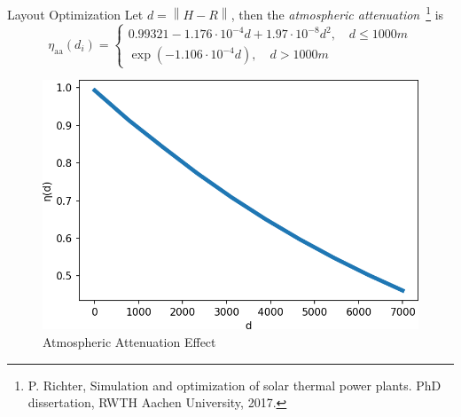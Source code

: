\documentclass[10pt, xcolor={dvipsnames}]{beamer}
\newcommand{\norm}[1]{\left\lVert#1\right\rVert}
\begin{document}
\begin{frame}{Layout Optimization}
Let $d = \norm{H - R}$, then the {\it atmospheric attenuation}~\footnote{{\tiny \color{blue} P. Richter, Simulation and optimization of solar thermal power plants. PhD dissertation, RWTH Aachen University, 2017.}} is
\begin{equation}
\eta_{\text{aa}}(d_{i}) = \begin{cases}
0.99321 - 1.176 \cdot 10^{-4} d + 1.97 \cdot 10^{-8} d^{2}, \quad d \leq 1000 m\\
\exp(-1.106 \cdot 10^{-4} d), \quad d > 1000 m
\end{cases}
\end{equation}
\begin{center}
\begin{figure}
\includegraphics[width=.5\textwidth]{../figures/AA-crop.png}
\caption{Atmospheric Attenuation Effect}
\end{figure}
\end{center}
\end{frame}
\end{document}
